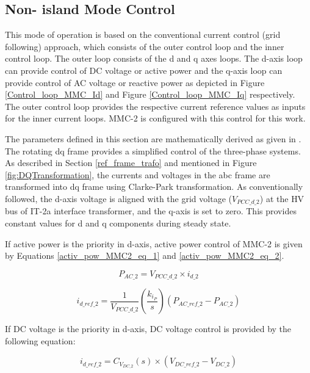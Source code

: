 \subsection{Non- island Mode Control}
This mode of operation is based on the conventional current control (grid following) approach, which consists of the outer control loop and the inner control loop. The outer loop consists of the d and q axes loops. The d-axis loop can provide control of \gls{DC} voltage or active power and the q-axis loop can provide control of \gls{AC} voltage or reactive power as depicted in Figure \ref{Control_loop_MMC_Id} and Figure \ref{Control_loop_MMC_Iq} respectively. The outer control loop provides the respective current reference values as inputs for the inner current loops. \gls{MMC}-2 is configured with this control for this work. 

The parameters defined in this section are mathematically derived as given in \cite{saad2015modelisation}. The rotating \gls{dq} frame provides a simplified control of the three-phase systems. As described in Section \ref{ref_frame_trafo} and mentioned in Figure \ref{fig:DQTransformation}, the currents and voltages in the abc frame are transformed into \gls{dq} frame using Clarke-Park transformation.
As conventionally followed, the d-axis voltage is aligned with the grid voltage ($V_{PCC\_d\_2}$) at the \gls{HV} bus of IT-2a interface transformer, and the q-axis is set to zero. This provides constant values for d and q components during steady state.


If active power is the priority in d-axis, active power control of \gls{MMC}-2 is given by Equations \ref{activ_pow_MMC2_eq_1} and \ref{activ_pow_MMC2_eq_2}.

\begin{equation}\label{activ_pow_MMC2_eq_1}
    P_{AC\_2} = V_{PCC\_d\_2} \times i_{d\_2}
\end{equation}

\begin{equation}\label{activ_pow_MMC2_eq_2}
    i_{d\_ref\_2} =  \frac{1}{V_{PCC\_d\_2}} \left(\frac{k_{i_P}}{s}\right)\left(P_{AC\_ref\_2}-P_{AC\_2}\right)
\end{equation}

If \gls{DC} voltage is the priority in d-axis, \gls{DC} voltage control is provided by the following equation:

\begin{equation}
    i_{d\_ref\_2} = C_{V_{DC\_2}}\left(s\right) \times \left(V_{DC\_ref\_2} - V_{DC\_2}\right)
\end{equation}

